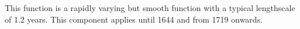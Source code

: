 This function is a rapidly varying but smooth function with a typical lengthscale of 1.2 years.
This component applies until 1644 and from 1719 onwards.